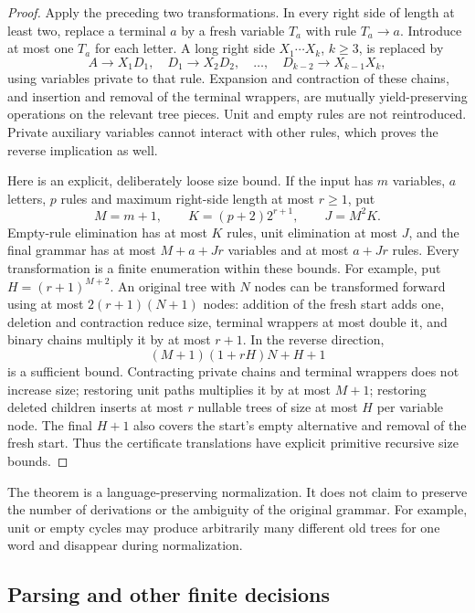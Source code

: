 \begin{proof}
Apply the preceding two transformations.  In every right side of length
at least two, replace a terminal $a$ by a fresh variable $T_a$ with rule
$T_a\to a$.  Introduce at most one $T_a$ for each letter.  A long right side
$X_1\cdots X_k$, $k\geq3$, is replaced by
\[
 A\to X_1D_1,\quad D_1\to X_2D_2,\quad\ldots,\quad
 D_{k-2}\to X_{k-1}X_k,
\]
using variables private to that rule.  Expansion and contraction of these
chains, and insertion and removal of the terminal wrappers, are mutually
yield-preserving operations on the relevant tree pieces.  Unit and empty
rules are not reintroduced.  Private auxiliary variables cannot interact
with other rules, which proves the reverse implication as well.

Here is an explicit, deliberately loose size bound.  If the input has $m$
variables, $a$ letters, $p$ rules and maximum right-side length at most
$r\geq1$, put
\[
 M=m+1,\qquad K=(p+2)2^{r+1},\qquad J=M^2K.
\]
Empty-rule elimination has at most $K$ rules, unit elimination at most
$J$, and the final grammar has at most $M+a+Jr$ variables and at most
$a+Jr$ rules.  Every transformation is a finite enumeration within these
bounds.  For example, put $H=(r+1)^{M+2}$.  An original tree with $N$ nodes
can be transformed forward using at most $2(r+1)(N+1)$ nodes: addition of
the fresh start adds one, deletion and contraction reduce size, terminal
wrappers at most double it, and binary chains multiply it by at most
$r+1$.  In the reverse direction,
\[
             (M+1)(1+rH)N+H+1
\]
is a sufficient bound.  Contracting private chains and terminal wrappers
does not increase size; restoring unit paths multiplies it by at most
$M+1$; restoring deleted children inserts at most $r$ nullable trees of
size at most $H$ per variable node.  The final $H+1$ also covers the
start's empty alternative and removal of the fresh start.  Thus the
certificate translations have explicit primitive recursive size bounds.
\end{proof}

The theorem is a language-preserving normalization.  It does not claim to
preserve the number of derivations or the ambiguity of the original grammar.
For example, unit or empty cycles may produce arbitrarily many different
old trees for one word and disappear during normalization.

\subsection{Parsing and other finite decisions}

